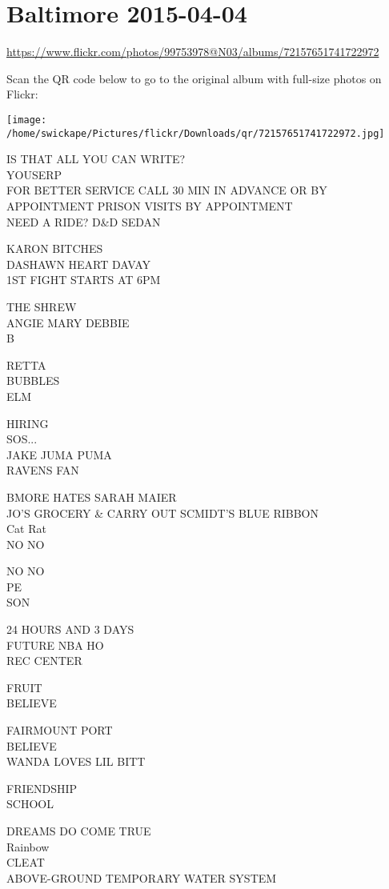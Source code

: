 \documentclass[10pt,letterpaper]{article}
\begin{document}
\section*{Baltimore 2015-04-04}

\url{https://www.flickr.com/photos/99753978@N03/albums/72157651741722972}

Scan the QR code below to go to the original album with full-size photos on Flickr:

\texttt{[image: /home/swickape/Pictures/flickr/Downloads/qr/72157651741722972.jpg]}
\pagebreak

IS THAT ALL YOU CAN WRITE?\\
YOUSERP\\
FOR BETTER SERVICE CALL 30 MIN IN ADVANCE OR BY APPOINTMENT PRISON VISITS BY APPOINTMENT\\
NEED A RIDE?  D\&D SEDAN

KARON BITCHES\\
DASHAWN HEART DAVAY\\
1ST FIGHT STARTS AT 6PM

THE SHREW\\
ANGIE MARY DEBBIE\\
B

RETTA\\
BUBBLES\\
ELM

HIRING\\
SOS...\\
JAKE JUMA PUMA\\
RAVENS FAN

BMORE HATES SARAH MAIER\\
JO'S GROCERY \& CARRY OUT SCMIDT'S BLUE RIBBON\\
Cat Rat\\
NO NO

NO NO\\
PE\\
SON

24 HOURS AND 3 DAYS\\
FUTURE NBA HO\\
REC CENTER

FRUIT\\
BELIEVE

FAIRMOUNT PORT\\
BELIEVE\\
WANDA LOVES LIL BITT

FRIENDSHIP\\
SCHOOL

DREAMS DO COME TRUE\\
Rainbow\\
CLEAT\\
ABOVE{-}GROUND TEMPORARY WATER SYSTEM
\end{document}
